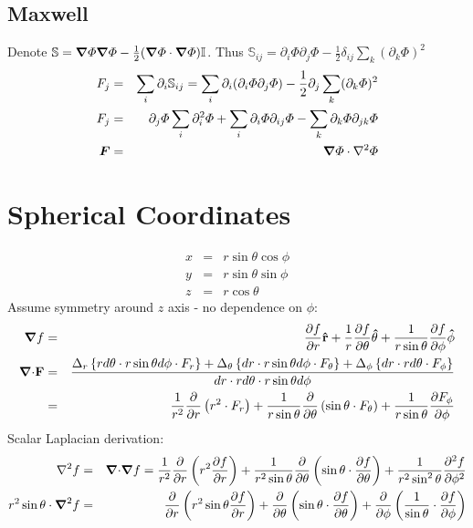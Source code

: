 \documentclass[11pt]{article}
\begin{document}
\subsection{Maxwell}
Denote $\mathbb{S} = \boldsymbol{\nabla} \varPhi \boldsymbol{\nabla} \varPhi - \frac{1}{2} (\boldsymbol{\nabla} \varPhi \cdot \boldsymbol{\nabla} \varPhi) \mathbb{I}$.
Thus $\mathbb{S}_{ij} = \partial_i \varPhi \partial_j \varPhi - \frac{1}{2} \delta_{ij} \sum_{k} (\partial_k \varPhi)^2$
\begin{eqnarray}
F_j &=& \sum_i \partial_i \mathbb{S}_{ij} =
\sum_i \partial_i (\partial_i \varPhi \partial_j \varPhi) - \frac{1}{2} \partial_j \sum_{k} (\partial_k \varPhi)^2 \\
F_j &=&  \partial_j \varPhi \sum_i \partial^2_i \varPhi +
\sum_i \partial_i \varPhi \partial_{ij} \varPhi - \sum_{k} \partial_k \varPhi \partial_{jk} \varPhi \\
\boldsymbol{F} &=& \boldsymbol{\nabla} \varPhi \cdot \nabla^2 \varPhi
\end{eqnarray}

\section{Spherical Coordinates}
\begin{eqnarray}
x &=& r \sin \theta \cos \phi \\
y &=& r \sin \theta \sin \phi \\
z &=& r \cos \theta
\end{eqnarray}
Assume symmetry around $z$ axis - no dependence on $\phi$:
\begin{eqnarray}
\boldsymbol{\nabla} f &=& \frac{\partial f}{\partial r} \mathbf{\hat{r}} +
\frac{1}{r} \frac{\partial f}{\partial \theta} \mathbf{\hat{\theta}} +
\frac{1}{r \sin\theta} \frac{\partial f}{\partial \phi} \mathbf{\hat{\phi}}
\\
\boldsymbol{\nabla} \mathbf{\cdot} \mathbf{F} &=& \frac{
\Delta_r\left\{r d\theta \cdot r \sin \theta d\phi \cdot F_r\right\} +
\Delta_\theta\left\{dr \cdot r \sin \theta d\phi \cdot F_\theta\right\} +
\Delta_\phi\left\{dr \cdot r d\theta \cdot F_\phi\right\}
}{dr \cdot r d\theta \cdot r \sin \theta d\phi}
\\
&=& \frac{1}{r^2}\frac{\partial}{\partial r} \left( r^2 \cdot F_r\right)
  + \frac{1}{r \sin\theta} \frac{\partial}{\partial \theta} \left( \sin\theta \cdot F_\theta\right)
  + \frac{1}{r \sin\theta} \frac{\partial F_\phi}{\partial \phi}
\end{eqnarray}
Scalar Laplacian derivation:
\begin{eqnarray}
\nabla^2 f &=& \boldsymbol{\nabla} \mathbf{\cdot} \boldsymbol{\nabla} f = \frac{1}{r^2}\frac{\partial}{\partial r}
\left( r^2 \frac{\partial f}{\partial r} \right) +
\frac{1}{r^2 \sin\theta} \frac{\partial}{\partial \theta} \left( \sin\theta \cdot \frac{\partial f}{\partial \theta}\right)
+ \frac{1}{r^2 \sin^2\theta} \frac{\partial^2 f}{\partial \phi^2}
\\
r^2 \sin\theta \cdot \boldsymbol{\nabla}^2 f &=& \frac{\partial}{\partial r} \left( r^2 \sin \theta \frac{\partial f}{\partial r} \right) +
\frac{\partial}{\partial \theta} \left( \sin\theta \cdot \frac{\partial f}{\partial \theta}\right) +
\frac{\partial}{\partial \phi} \left( \frac{1}{\sin\theta} \cdot \frac{\partial f}{\partial \phi}\right)
\end{eqnarray}
\end{document}
